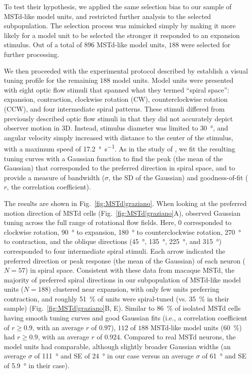 To test their hypothesis, we applied the same selection bias to our sample
of \ac{MSTd}-like model units, and restricted further analysis to the 
selected subpopulation. The selection process was mimicked simply by 
making it more likely for a model unit to be selected the stronger it
responded to an expansion stimulus. Out of a total of $896$ \ac{MSTd}-like
model units, $188$ were selected for further processing.

We then proceeded with the experimental protocol described by 
\cite{Graziano1994} establish a visual tuning profile for the remaining 
$188$ model units. Model units were presented with eight optic flow stimuli 
that spanned what they termed ``spiral space'': expansion, contraction, 
clockwise rotation (CW), counterclockwise rotation (CCW), and four 
intermediate spiral patterns. These stimuli differed from previously 
described optic flow stimuli in that they did not accurately depict observer
motion in 3D. Instead, stimulus diameter was limited to \SI{30}{\degree}, 
and angular velocity simply increased with distance to the center of the
stimulus, with a maximum speed of \SI{17.2}{\degree\per\second}. 
As in the study of \cite{Graziano1994}, we fit the resulting tuning curves 
with a Gaussian function to find the peak (the mean of the Gaussian) that
corresponded to the preferred direction in spiral space, and to provide a
measure of bandwidth ($\sigma$, the SD of the Gaussian) and goodness-of-fit
($r$, the correlation coefficient).

The results are shown in Fig.~\ref{fig:MSTd|graziano}. 
When looking at the preferred motion direction of \ac{MSTd} cells 
(Fig.~\ref{fig:MSTd|graziano}A), \cite{Graziano1994} observed Gaussian 
tuning across the full range of rotational flow fields. Here, $0$ 
corresponded to clockwise rotation, \SI{90}{\degree} to expansion, 
\SI{180}{\degree} to counterclockwise rotation, \SI{270}{\degree} to 
contraction, and the oblique directions (\SI{45}{\degree}, 
\SI{135}{\degree}, \SI{225}{\degree}, and \SI{315}{\degree}) corresponded
to four intermediate spiral stimuli. Each arrow indicated the preferred 
direction or peak response (the mean of the Gaussian) of each neuron 
($N=57$) in spiral space. Consistent with these data from macaque \ac{MSTd},
the majority of preferred spiral directions in our subpopulation of 
\ac{MSTd}-like model units ($N=188$) clustered near expansion, with only 
few units preferring contraction, and roughly \SI{51}{\percent} of units
were spiral-tuned (vs. \SI{35}{\percent} in their sample)
(Fig.~\ref{fig:MSTd|graziano}B, E). Similar to \SI{86}{\percent} of isolated
\ac{MSTd} cells having smooth tuning curves and good Gaussian fits (i.e.,
a correlation coefficient of $r \geq 0.9$, with an average $r$ of $0.97$),
$112$ of $188$ \ac{MSTd}-like model units (\SI{60}{\percent}) had 
$r \geq 0.9$, with an average $r$ of $0.924$. Compared to real \ac{MSTd}
neurons, the model units had comparable, although slightly broader Gaussian
widths (an average $\sigma$ of \SI{111}{\degree} and SE of \SI{24}{\degree}
in our case versus an average $\sigma$ of \SI{61}{\degree} and SE of 
\SI{5.9}{\degree} in their case).

